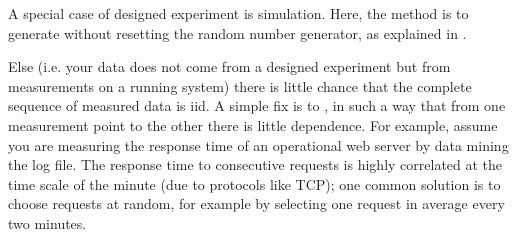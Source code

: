 A special case of designed experiment is
simulation. Here, the method is to generate
 without resetting the random
number generator, as explained in
.

Else (i.e. your data does not come from a designed experiment
but from measurements on a running system) there is little
chance that the complete sequence of measured data is iid. A
simple fix is to , in such  a
way that from one measurement point to the other there is
little dependence. For example, assume you are measuring the
response time of an operational web server by data mining the
log file. The response time to consecutive requests is highly
correlated at the time scale of the minute (due to protocols
like TCP); one common solution is to choose requests at random,
for example by selecting one request in average every two
minutes.

